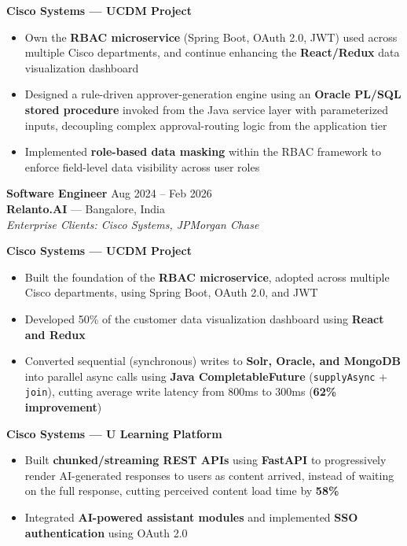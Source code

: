 \documentclass[a4paper,10.5pt]{article}
\begin{document}
\textbf{Cisco Systems — UCDM Project}
\begin{itemize}
  \item Own the \textbf{RBAC microservice} (Spring Boot, OAuth 2.0, JWT) used across multiple Cisco departments, and continue enhancing the \textbf{React/Redux} data visualization dashboard
  \item Designed a rule-driven approver-generation engine using an \textbf{Oracle PL/SQL stored procedure} invoked from the Java service layer with parameterized inputs, decoupling complex approval-routing logic from the application tier
  \item Implemented \textbf{role-based data masking} within the RBAC framework to enforce field-level data visibility across user roles
\end{itemize}

\vspace{2pt}
\textbf{Software Engineer} \hfill Aug 2024 -- Feb 2026\\
\textbf{Relanto.AI} — Bangalore, India\\
\textit{Enterprise Clients: Cisco Systems, JPMorgan Chase}

\textbf{Cisco Systems — UCDM Project}
\begin{itemize}
  \item Built the foundation of the \textbf{RBAC microservice}, adopted across multiple Cisco departments, using Spring Boot, OAuth 2.0, and JWT
  \item Developed 50\% of the customer data visualization dashboard using \textbf{React and Redux}
  \item Converted sequential (synchronous) writes to \textbf{Solr, Oracle, and MongoDB} into parallel async calls using \textbf{Java CompletableFuture} (\texttt{supplyAsync} + \texttt{join}), cutting average write latency from 800ms to 300ms (\textbf{62\% improvement})
\end{itemize}

\textbf{Cisco Systems — U Learning Platform}
\begin{itemize}
  \item Built \textbf{chunked/streaming REST APIs} using \textbf{FastAPI} to progressively render AI-generated responses to users as content arrived, instead of waiting on the full response, cutting perceived content load time by \textbf{58\%}
  \item Integrated \textbf{AI-powered assistant modules} and implemented \textbf{SSO authentication} using OAuth 2.0
\end{itemize}
\end{document}
